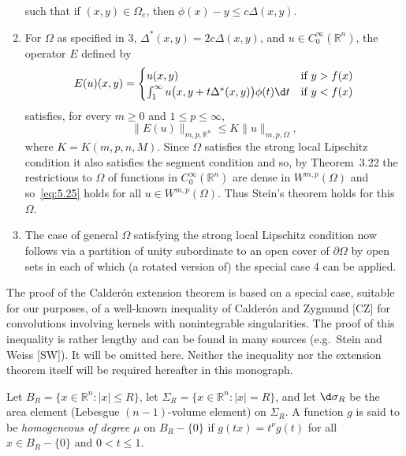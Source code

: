 \begin{para}
\begin{enumerate}
      such that if $(x,y)\in\Omega_e$, then $\phi(x)-y \leq c\Delta(x,y)$.
    \item For $\Omega$ as specified in 3, $\Delta^*(x,y) = 2c\Delta(x,y)$,
      and $u\in C_0^\infty(\mathbb{R}^n)$, the operator $E$ defined by
      \[E(u)(x,y) = 
        \begin{cases}
          u(x,y) & \text{if}\ y>f(x) \\
          \int_1^\infty u\bigl(x, y+t\Delta^*(x,y)\bigr) \phi(t) \d t & \text{if}\ y<f(x)
        \end{cases}\]
      satisfies, for every $m\geq 0$ and $1\leq p\leq\infty$,
      \begin{equation}\label{eq:5.25}
        \|E(u)\|_{m,p,\mathbb{R}^n} \leq K \|u\|_{m,p,\Omega}, 
      \end{equation}
      where $K = K(m,p,n,M)$. Since $\Omega$ satisfies the strong local
      Lipschitz condition it also satisfies the segment condition and so,
      by Theorem~3.22 the restrictions to $\Omega$ of functions in $C_0^\infty(\mathbb{R}^n)$
      are dense in $W^{m,p}(\Omega)$ and so~\eqref{eq:5.25} holds for all
      $u\in W^{m,p}(\Omega)$. Thus Stein's theorem holds for this $\Omega$.
    \item The case of general $\Omega$ satisfying the strong local Lipschitz
      condition now follows via a partition of unity subordinate to an open
      cover of $\partial\Omega$ by open sets in each of which (a rotated version
      of) the special case 4 can be applied.
  \end{enumerate}
\end{para}


\begin{para}
  The proof of the Calder\'on extension theorem is based on a special case,
  suitable for our purposes, of a well-known inequality of Calder\'on and
  Zygmund [CZ] for convolutions involving kernels with nonintegrable
  singularities. The proof of this inequality is rather lengthy and can be found
  in many sources (e.g.~Stein and Weiss [SW]). It will be omitted here.
  Neither the inequality nor the extension theorem itself will be required
  hereafter in this monograph.

  Let $B_R = \{x\in\mathbb{R}^n : |x|\leq R\}$,
  let $\Sigma_R = \{x\in\mathbb{R}^n : |x|=R\}$, and let $\d\sigma_R$ be the area
  element (Lebesgue $(n-1)$-volume element) on $\Sigma_R$. A function $g$
  is said to be \emph{homogeneous of degree $\mu$} on $B_R - \{0\}$
  if $g(tx) = t^\nu g(t)$ for all $x\in B_R - \{0\}$ and $0<t\leq 1$.
\end{para}


